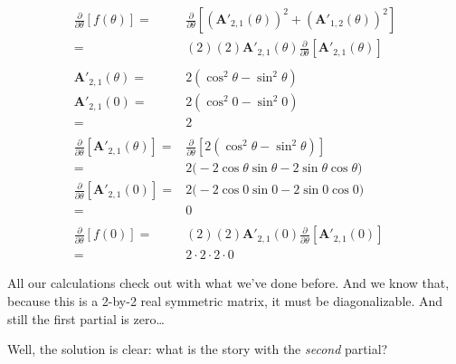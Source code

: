 \documentclass[11pt, oneside]{amsart}
\newcommand{\fpartial}[2]{\frac{\partial #1}{\partial #2}}
\newcommand{\mtx}[1]{\bm{#1}}
\newcommand{\fptheta}{\fpartial{}{\theta}}
\newcommand{\mtxA}{\mtx{A}}
\begin{document}
\begin{equation*}
  \begin{split}
      \fptheta \left[f(\theta)\right]
    ={}&
      \fptheta \left[
        \left( \mtxA'_{2, 1}(\theta) \right)^2
        + \left( \mtxA'_{1, 2}(\theta) \right)^2
      \right]
    \\
    ={}&
      (2)(2)
      \mtxA'_{2, 1}(\theta)
      \fptheta \left[ \mtxA'_{2, 1}(\theta) \right] \\
    \\
      \mtxA'_{2, 1}(\theta)
    ={}&
      2 \left( \cos^2\theta - \sin^2\theta \right) \\
      \mtxA'_{2, 1}(0)
    ={}&
        2 \left( \cos^2 0 - \sin^2 0 \right) \\
    ={}&
      2 \\
    \\
      \fptheta \left[ \mtxA'_{2, 1}(\theta) \right]
    ={}&
      \fptheta \left[
        2 \left( \cos^2\theta - \sin^2\theta \right)
      \right] \\
    ={}&
      2 \big( -2\cos\theta \sin\theta - 2\sin\theta\cos\theta \big) \\
      \fptheta \left[ \mtxA'_{2, 1}(0) \right]
    ={}&
      2 \big( -2\cos 0\sin 0 - 2\sin 0\cos 0 \big) \\
    ={}&
      0 \\
    \\
      \fptheta \left[f(0)\right]
    ={}&
      (2)(2)
      \mtxA'_{2, 1}(0)
      \fptheta \left[ \mtxA'_{2, 1}(0) \right] \\
    ={}&
      2 \cdot 2 \cdot 2 \cdot 0
  \end{split}
\end{equation*}

All our calculations check out with what we've done before. And we know
that, because this is a 2-by-2 real symmetric matrix, it must be
diagonalizable. And still the first partial is zero\dots

Well, the solution is clear: what is the story with the \textit{second}
partial?
\end{document}
